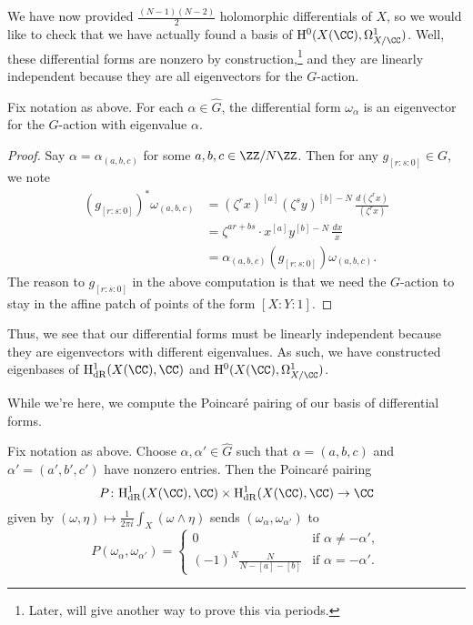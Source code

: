 \documentclass[../thesis.tex]{subfiles}
\begin{document}
We have now provided $\frac{(N-1)(N-2)}2$ holomorphic differentials of $X$, so we would like to check that we have actually found a basis of $\mathrm H^0(X(\CC),\Omega^1_{X/\CC})$. Well, these differential forms are nonzero by construction,\footnote{Later,  will give another way to prove this via periods.} and they are linearly independent because they are all eigenvectors for the $G$-action.
\begin{lemma}
	Fix notation as above. For each $\alpha\in\widehat G$, the differential form $\omega_\alpha$ is an eigenvector for the $G$-action with eigenvalue $\alpha$.
\end{lemma}
\begin{proof}
	Say $\alpha=\alpha_{(a,b,c)}$ for some $a,b,c\in\ZZ/N\ZZ$. Then for any $g_{[r:s:0]}\in G$, we note
	\begin{align*}
		(g_{[r:s:0]})^*\omega_{(a,b,c)} &= (\zeta^rx)^{[a]}(\zeta^sy)^{[b]-N}\,\frac{d(\zeta^rx)}{(\zeta^rx)} \\
		&= \zeta^{ar+bs}\cdot x^{[a]}y^{[b]-N}\,\frac{dx}x \\
		&= \alpha_{(a,b,c)}(g_{[r:s:0]})\omega_{(a,b,c)}.
	\end{align*}
	The reason to $g_{[r:s:0]}$ in the above computation is that we need the $G$-action to stay in the affine patch of points of the form $[X:Y:1]$.
\end{proof}
\begin{remark} \label{rem:diagonalize-de-rham}
	Thus, we see that our differential forms must be linearly independent because they are eigenvectors with different eigenvalues. As such, we have constructed eigenbases of $\mathrm H^1_{\mathrm{dR}}(X(\CC),\CC)$ and $\mathrm H^0(X(\CC),\Omega^1_{X/\CC})$.
\end{remark}
While we're here, we compute the Poincar\'e pairing of our basis of differential forms. 
\begin{lemma} \label{lem:fermat-poincare-pairing}
	Fix notation as above. Choose $\alpha,\alpha'\in\widehat G$ such that $\alpha=(a,b,c)$ and $\alpha'=(a',b',c')$ have nonzero entries. Then the Poincar\'e pairing
	\[P\colon\mathrm H^1_{\mathrm{dR}}(X(\CC),\CC)\times\mathrm H^1_{\mathrm{dR}}(X(\CC),\CC)\to\CC\]
	given by $(\omega,\eta)\mapsto\frac1{2\pi i}\int_X(\omega\land\eta)$ sends $(\omega_\alpha,\omega_{\alpha'})$ to
	\[P(\omega_\alpha,\omega_{\alpha'})=\begin{cases}
		0 & \text{if }\alpha\ne-\alpha', \\
		(-1)^N\frac N{N-[a]-[b]} & \text{if }\alpha=-\alpha'.
	\end{cases}\]
\end{lemma}
\end{document}
